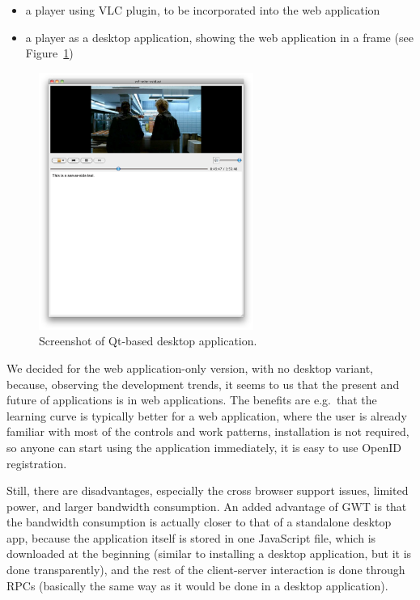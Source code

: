 \begin{itemize}
\item a player using VLC plugin, to be incorporated into the web application
\item a player as a desktop application, showing the web application in a frame (see Figure~\ref{fig:figures_desktop-app-player})
\end{itemize}

\begin{figure}[h!]
	\centering
		\includegraphics[width=7cm]{figures/desktop-app-player.png}
	\caption{Screenshot of Qt-based desktop application.}
	\label{fig:figures_desktop-app-player}
\end{figure}

We decided for the web application-only version, with no desktop variant, because, observing the development trends, it seems to us that the present and future of applications is in web applications. The benefits are e.g.\ that the learning curve is typically better for a web application, where the user is already familiar with most of the controls and work patterns, installation is not required, so anyone can start using the application immediately, it is easy to use OpenID registration.

Still, there are disadvantages, especially the cross browser support issues, limited power, and larger bandwidth consumption.
An added advantage of GWT is that the bandwidth consumption is actually closer to that of a standalone desktop app, because the application itself is stored in one JavaScript file, which is downloaded at the beginning (similar to installing a desktop application, but it is done transparently), and the rest of the client-server interaction is done through RPCs (basically the same way as it would be done in a desktop application).

